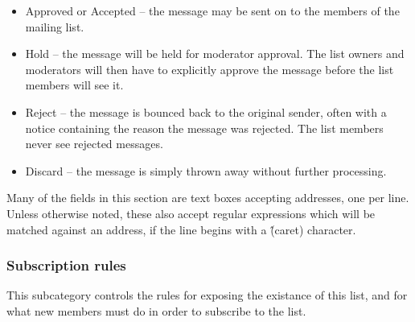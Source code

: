 \documentclass{howto}
\begin{document}
\begin{itemize}
\item Approved or Accepted -- the message may be sent on to the
      members of the mailing list.

\item Hold -- the message will be held for moderator approval.  The
      list owners and moderators will then have to explicitly approve
      the message before the list members will see it.

\item Reject -- the message is bounced back to the original sender,
      often with a notice containing the reason the message was
      rejected.  The list members never see rejected messages.

\item Discard -- the message is simply thrown away without further
      processing.
\end{itemize}

Many of the fields in this section are text boxes accepting addresses,
one per line.  Unless otherwise noted, these also accept regular
expressions which will be matched against an address, if the line
begins with a \^ (caret) character.

\subsubsection{Subscription rules}

This subcategory controls the rules for exposing the existance of this
list, and for what new members must do in order to subscribe to the
list.
\end{document}
